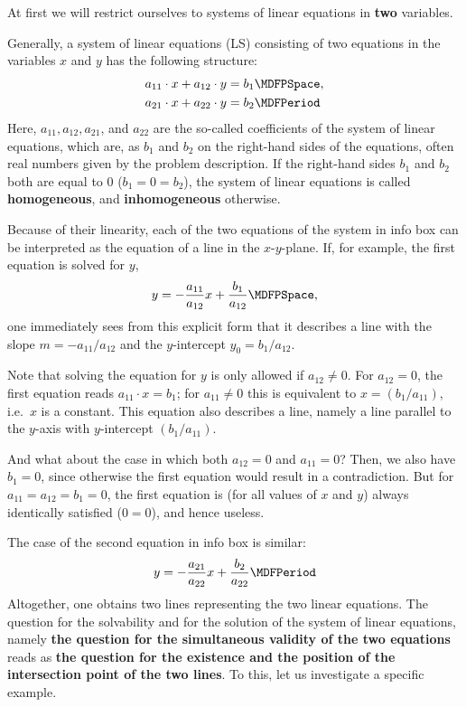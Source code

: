 \begin{MIntro}
At first we will restrict ourselves to systems of linear equations in \textbf{two}
variables. 

\begin{MInfo}
Generally, a system of linear equations (LS) consisting of two equations 
in the variables $x$ and $y$ has the following structure:
\begin{eqnarray*}
	a_{11} \cdot x + a_{12} \cdot y &= b_{1} \MDFPSpace, \\ 
	a_{21} \cdot x + a_{22} \cdot y &= b_2 \MDFPeriod
\end{eqnarray*}
Here, $a_{11}, a_{12}, a_{21}$, and $a_{22}$ are the so-called coefficients of the system
of linear equations, which are, as $b_1$ and $b_2$ on the right-hand sides of the 
equations, often real numbers given by the problem description.
If the right-hand sides $b_1$ and $b_2$ both are equal to $0$ ($b_1 = 0 = b_2$), 
the system of linear equations is called \textbf{homogeneous}, and \textbf{inhomogeneous}
otherwise.


\end{MInfo}

Because of their linearity, each of the two equations of the system in info box 
can be interpreted as the equation of a line in the $x$-$y$-plane. If, for example, the first equation
is solved for $y$,
$$y = - \Mdfrac{a_{11}}{a_{12}} x + \Mdfrac{b_1}{a_{12}} \MDFPSpace ,$$
one immediately sees from this explicit form that it describes a line with the slope 
$m = - a_{11}/a_{12}$ and the $y$-intercept $y_0=b_1/a_{12}$.

Note that solving the equation for $y$ is only allowed if $a_{12} \neq 0$. For $a_{12} = 0$,
the first equation reads $a_{11} \cdot x = b_1$; for $a_{11} \neq 0$ this is equivalent 
to $x = (b_1/a_{11})$, i.e.\ $x$ is a constant. This equation also describes a line, namely 
a line parallel to the $y$-axis with $y$-intercept $(b_1/a_{11})$.

And what about the case in which both $a_{12} = 0$ and $a_{11} = 0$? Then, we also have $b_1 = 0$, since 
otherwise the first equation would result in a contradiction. But for $a_{11} = a_{12} = b_1 = 0$,
the first equation is (for all values of $x$ and $y$) always identically satisfied ($0 = 0$),
and hence useless.

The case of the second equation in info box  is similar:
$$y = - \Mdfrac{a_{21}}{a_{22}} x + \Mdfrac{b_2}{a_{22}} \MDFPeriod$$
Altogether, one obtains two lines representing the two linear equations. The question
for the solvability and for the solution of the system of linear equations, namely 
\textbf{the question for the simultaneous validity of the two equations} reads as \textbf{the question for
the existence and the position of the intersection point of the two lines}. 
To this, let us investigate a specific example.


\end{MIntro}
